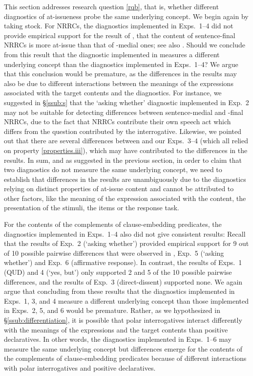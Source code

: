 \documentclass[times,linguex]{glossa}
\begin{document}
This section addresses research question \ref{rqb}, that is, whether different diagnostics of at-issueness probe the same underlying concept. We begin again by taking stock. For NRRCs, the diagnostics implemented in Exps.~1--4 did not provide empirical support for the result of \citealt[Exp.~2]{syrett_experimental_2015}, that the content of sentence-final NRRCs is more at-issue than that of -medial ones; see also \citealt{snider_anaphoric_2017}. Should we conclude from this result that the diagnostic implemented in \citealt[Exp.~2]{syrett_experimental_2015} measures a different underlying concept than the diagnostics implemented in Exps.~1--4?
We argue that this conclusion would be premature, as the differences in the results may also be due to different interactions between the meanings of the expressions associated with the target contents and the diagnostics. For instance, we suggested in \S\ref{ssub:s} that the `asking whether' diagnostic implemented in Exp.~2 may not be suitable for detecting differences between sentence-medial and -final NRRCs, due to the fact that NRRCs contribute their own speech act which differs from the question contributed by the interrogative. Likewise, we pointed out that there are several differences between \citealt[Exp.~2]{syrett_experimental_2015} and our Exps.~3--4 (which all relied on property \ref{properties.iii}), which may have contributed to the differences in the results. In sum, and as suggested in the previous section, in order to claim that two diagnostics do not measure the same underlying concept, we need to establish that differences in the results are unambiguously due to the diagnostics relying on distinct properties of at-issue content and cannot be attributed to other factors, like the meaning of the expression associated with the content, the presentation of the stimuli, the items or the response task.

For the contents of the complements of clause-embedding predicates, the diagnostics implemented in Exps.~1--4 also did not give consistent results: Recall that the results of Exp.~2 (`asking whether') provided empirical support for 9 out of 10 possible pairwise differences that were observed in \citealt{degen_projection_2025}, Exp.~5 (`asking whether') and Exp.~6 (affirmative response). In contrast, the results of Exps.~1 (QUD)  and 4 (`yes, but') only supported 2 and 5 of the 10 possible pairwise differences, and the results of Exp.~3 (direct-dissent) supported none. We again argue that concluding from these results that the diagnostics implemented in Exps.~1, 3, and 4 measure a different underlying concept than those implemented in Exps.~2, 5, and 6 would be premature. Rather, as we hypothesized in \S\ref{ssub:differentiation}, it is possible that polar interrogatives interact differently with the meanings of the expressions and the target contents than positive declaratives. In other words, the diagnostics implemented in Exps.~1--6 may measure the same underlying concept but differences emerge for the contents of the complements of clause-embedding predicates because of different interactions with polar interrogatives and positive declaratives.
\end{document}
